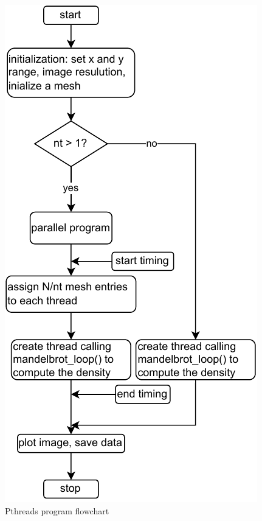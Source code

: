 \documentclass[twoside,12pt]{article}
\theoremstyle{definition}
\theoremstyle{remark}
\begin{document}
\begin{figure}[h!]
    \centering
    \includegraphics[scale=1.35]{../flowchart_pthread.drawio.pdf}
    \caption{Pthreads program flowchart}
    \label{fig:pthflow}
\end{figure}
\end{document}
